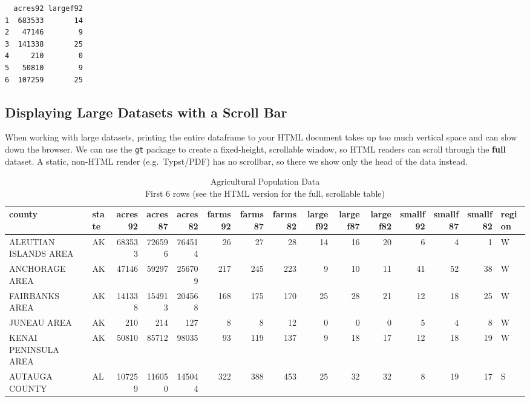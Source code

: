 \documentclass[
  letterpaper,
  DIV=11,
  numbers=noendperiod]{scrreprt}
\renewcommand{\[}{\begin{equation}}
\renewcommand{\]}{\end{equation}}
\begin{document}
\begin{verbatim}
  acres92 largef92
1  683533       14
2   47146        9
3  141338       25
4     210        0
5   50810        9
6  107259       25
\end{verbatim}

\subsection{Displaying Large Datasets with a Scroll
Bar}\label{displaying-large-datasets-with-a-scroll-bar}

When working with large datasets, printing the entire dataframe to your
HTML document takes up too much vertical space and can slow down the
browser. We can use the \texttt{gt} package to create a fixed-height,
scrollable window, so HTML readers can scroll through the \textbf{full}
dataset. A static, non-HTML render (e.g.~Typst/PDF) has no scrollbar, so
there we show only the head of the data instead.

\begin{table}
\caption*{
{\fontsize{20}{25}\selectfont  Agricultural Population Data\fontsize{12}{15}\selectfont } \\ 
{\fontsize{14}{17}\selectfont  First 6 rows (see the HTML version for the full, scrollable table)\fontsize{12}{15}\selectfont }
} 
\fontsize{12.0pt}{14.0pt}\selectfont
\begin{tabular*}{\linewidth}{@{\extracolsep{\fill}}llrrrrrrrrrrrrl}
\toprule
county & state & acres92 & acres87 & acres82 & farms92 & farms87 & farms82 & largef92 & largef87 & largef82 & smallf92 & smallf87 & smallf82 & region \\ 
\midrule\addlinespace[2.5pt]
ALEUTIAN ISLANDS AREA & AK & 683533 & 726596 & 764514 & 26 & 27 & 28 & 14 & 16 & 20 & 6 & 4 & 1 & W \\ 
ANCHORAGE AREA & AK & 47146 & 59297 & 256709 & 217 & 245 & 223 & 9 & 10 & 11 & 41 & 52 & 38 & W \\ 
FAIRBANKS AREA & AK & 141338 & 154913 & 204568 & 168 & 175 & 170 & 25 & 28 & 21 & 12 & 18 & 25 & W \\ 
JUNEAU AREA & AK & 210 & 214 & 127 & 8 & 8 & 12 & 0 & 0 & 0 & 5 & 4 & 8 & W \\ 
KENAI PENINSULA AREA & AK & 50810 & 85712 & 98035 & 93 & 119 & 137 & 9 & 18 & 17 & 12 & 18 & 19 & W \\ 
AUTAUGA COUNTY & AL & 107259 & 116050 & 145044 & 322 & 388 & 453 & 25 & 32 & 32 & 8 & 19 & 17 & S \\ 
\bottomrule
\end{tabular*}
\end{table}
\end{document}
